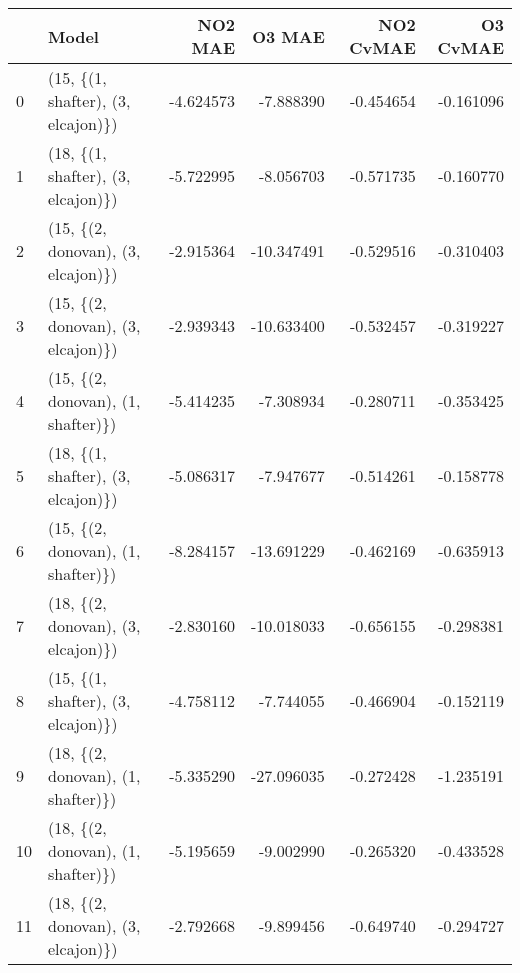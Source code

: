 \begin{tabular}{llrrrr}
\toprule
{} &                               Model &   NO2 MAE &     O3 MAE &  NO2 CvMAE &  O3 CvMAE \\
\midrule
0  &  (15, \{(1, shafter), (3, elcajon)\}) & -4.624573 &  -7.888390 &  -0.454654 & -0.161096 \\
1  &  (18, \{(1, shafter), (3, elcajon)\}) & -5.722995 &  -8.056703 &  -0.571735 & -0.160770 \\
2  &  (15, \{(2, donovan), (3, elcajon)\}) & -2.915364 & -10.347491 &  -0.529516 & -0.310403 \\
3  &  (15, \{(2, donovan), (3, elcajon)\}) & -2.939343 & -10.633400 &  -0.532457 & -0.319227 \\
4  &  (15, \{(2, donovan), (1, shafter)\}) & -5.414235 &  -7.308934 &  -0.280711 & -0.353425 \\
5  &  (18, \{(1, shafter), (3, elcajon)\}) & -5.086317 &  -7.947677 &  -0.514261 & -0.158778 \\
6  &  (15, \{(2, donovan), (1, shafter)\}) & -8.284157 & -13.691229 &  -0.462169 & -0.635913 \\
7  &  (18, \{(2, donovan), (3, elcajon)\}) & -2.830160 & -10.018033 &  -0.656155 & -0.298381 \\
8  &  (15, \{(1, shafter), (3, elcajon)\}) & -4.758112 &  -7.744055 &  -0.466904 & -0.152119 \\
9  &  (18, \{(2, donovan), (1, shafter)\}) & -5.335290 & -27.096035 &  -0.272428 & -1.235191 \\
10 &  (18, \{(2, donovan), (1, shafter)\}) & -5.195659 &  -9.002990 &  -0.265320 & -0.433528 \\
11 &  (18, \{(2, donovan), (3, elcajon)\}) & -2.792668 &  -9.899456 &  -0.649740 & -0.294727 \\
\bottomrule
\end{tabular}
